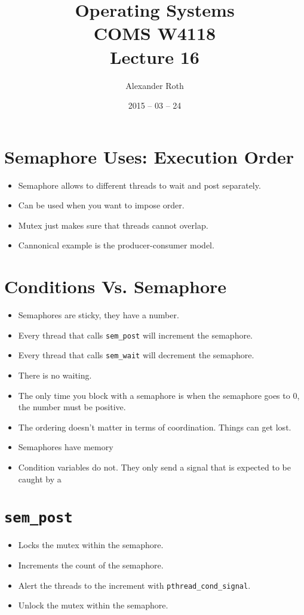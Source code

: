 \documentclass[]{article}
\begin{document}
\newcommand{\code}{\texttt}
\newtheorem{thm}{Theorem}
\title{Operating Systems \\ COMS W4118 \\ Lecture 16}
\author{Alexander Roth}
\date{2015 -- 03 -- 24}
\maketitle

\section{Semaphore Uses: Execution Order}
\begin{itemize}
\item Semaphore allows to different threads to wait and post separately.
\item Can be used when you want to impose order.
\item Mutex just makes sure that threads cannot overlap.
\item Cannonical example is the producer-consumer model.
\end{itemize}

\section{Conditions Vs. Semaphore}
\begin{itemize}
\item Semaphores are sticky, they have a number.
\item Every thread that calls \code{sem\_post} will increment the semaphore.
\item Every thread that calls \code{sem\_wait} will decrement the semaphore.
\item There is no waiting.
\item The only time you block with a semaphore is when the semaphore goes to 0,
the number must be positive.
\item The ordering doesn't matter in terms of coordination. Things can get lost.
\item Semaphores have memory
\item Condition variables do not. They only send a signal that is expected to be
caught by a
\end{itemize}

\section{\code{sem\_post}}
\begin{itemize}
\item Locks the mutex within the semaphore.
\item Increments the count of the semaphore.
\item Alert the threads to the increment with \code{pthread\_cond\_signal}.
\item Unlock the mutex within the semaphore.
\end{itemize}
\end{document}
